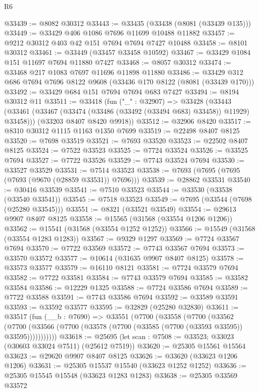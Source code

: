 \begin{lexlean}{R6}
\begin{coremodule}
@33439 := @8082 @30312
@33443 := @33435 (@33438 (@8081 (@33439 @135)))
@33449 := @33429 @406 @1086 @7696 @11699 @10488 @11882
@33457 := @9212 @30312 @403 @42 @151 @7694 @7694 @7427 @10488
@33458 := @8101 @30312
@33461 := @33449 (@33457 @33458 @10592)
@33467 := @33429 @1084 @151 @11697 @7694 @11880 @7427
@33468 := @8057 @30312
@33474 := @33468 @217 @1083 @7697 @11696 @11898 @11880
@33486 := @33429 @312 @686 @7694 @7696 @8122 @9608 (@33436 @170 @8122 (@8081 (@33439 @170)))
@33492 := @33429 @684 @151 @7694 @7694 @683 @7427
@33494 := @8194 @30312 @11
@33511 := @33418
    (fun ("_" : @32907) =>
    @33428
      (@33443 (@33461 (@33467 (@33474 (@33486 (@33492 (@33494 @683) @33458)) @11929) @33458)))
      (@33203 @8407 @8420 @9918))
@33512 := @32906 @8420
@33517 := @8310 @30312 @1115 @1163 @1350 @7699
@33519 := @22498 @8407 @8125
@33520 := @7698 @33519
@33521 := @7693 @33520
@33523 := @22502 @8407 @8125
@33524 := @7522 @33523
@33525 := @7724 @33524
@33526 := @33525 @7694
@33527 := @7722 @33526
@33529 := @7743 @33524 @7694
@33530 := @33527 @33529
@33531 := @7514 @33523
@33538 := @7693 (@7695 (@7695 (@7693 (@9670 (@28859 @33531)) @7696)))
@33539 := @28862 @33531
@33540 := @30416 @33539
@33541 := @7510 @33523
@33544 := @33530 (@33538 (@33540 @33541))
@33545 := @7518 @33523
@33549 := @7695 (@33544 (@7698 (@25280 @33545)))
@33551 := @8321 (@33521 @33549)
@33554 := @29613 @9907 @8407 @8125
@33558 := @15565 (@31568 (@33554 @1206 @1206))
@33562 := @15541 (@31568 (@33554 @1252 @1252))
@33566 := @15549 (@31568 (@33554 @1283 @1283))
@33567 := @9329 @1297
@33569 := @7724 @33567 @7694
@33570 := @7722 @33569
@33572 := @7743 @33567 @7694
@33573 := @33570 @33572
@33577 := @10614 (@31635 @9907 @8407 @8125)
@33578 := @33573 @33577
@33579 := @16110 @8121
@33581 := @7724 @33579 @7694
@33582 := @7722 @33581
@33584 := @7743 @33579 @7694
@33585 := @33582 @33584
@33586 := @12229 @1325
@33588 := @7724 @33586 @7694
@33589 := @7722 @33588
@33591 := @7743 @33586 @7694
@33592 := @33589 @33591
@33593 := @33592 @33577
@33595 := @32829 (@25280 @32830)
@33611 := @33517
    (fun (__b : @7690) =>
    @33551
      (@7700
        (@33558
          (@7700
            (@33562
              (@7700 (@33566 (@7700 (@33578 (@7700 (@33585 (@7700 (@33593 @33595)) @33595)))))))))))
@33618 := @25695 (let scan : @7508 := @33523; @33023 (@30603 @33024 @7511) (@25612 @7519))
@33620 := @25305 @15561 @15564
@33623 := @29620 @9907 @8407 @8125
@33626 := @33620 (@33623 @1206 @1206)
@33631 := @25305 @15537 @15540 (@33623 @1252 @1252)
@33636 := @25305 @15545 @15548 (@33623 @1283 @1283)
@33638 := @25305 @33569 @33572

\end{coremodule}
\end{lexlean}
